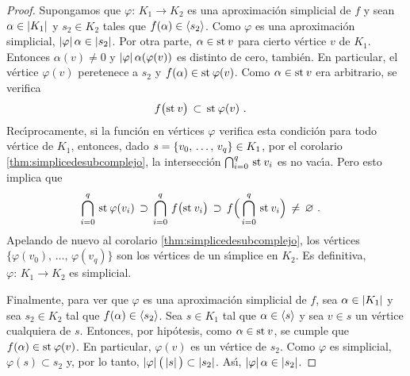 \begin{proof}
	Supongamos que $\varphi:\,K_{1}\rightarrow K_{2}$ es una
	aproximaci\'{o}n simplicial de $f$ y sean $\alpha\in\left|K_{1}\right|$ y
	$s_{2}\in K_{2}$ tales que $f(\alpha)\in\langle s_{2}\rangle$.
	Como $\varphi$ es una aproximaci\'{o}n simplicial,
	$\left|\varphi\right|\alpha\in\left|s_{2}\right|$. Por otra parte,
	$\alpha\in\mathrm{st}_{}\,v$ para cierto v\'{e}rtice $v$ de $K_{1}$.
	Entonces $\alpha(v)\not =0$ y $\left|\varphi\right|\alpha(\varphi(v))$
	es distinto de cero, tambi\'{e}n. En particular, el v\'{e}rtice
	$\varphi(v)$ peretenece a $s_{2}$ y
	$f(\alpha)\in\mathrm{st}_{}\,\varphi(v)$. Como $\alpha\in\mathrm{st}_{}\,v$
	era arbitrario, se verifica
	\begin{align*}
		f\big(\mathrm{st}_{}\,v\big) & \,\subset\,\mathrm{st}_{}\,\varphi(v)
		\text{ .}
	\end{align*}
	Rec\'{\i}procamente, si la funci\'{o}n en v\'{e}rtices $\varphi$
	verifica esta condici\'{o}n para todo v\'{e}rtice de $K_{1}$,
	entonces, dado $s=\{\lista[0]{v}{q}\}\in K_{1}$, por el corolario
	\ref{thm:simplicedesubcomplejo}, la intersecci\'{o}n
	$\bigcap_{i=0}^{q}\,\mathrm{st}_{}\,v_{i}$ es no vac\'{\i}a. Pero esto
	implica que
	\begin{align*}
		\bigcap_{i=0}^{q}\,\mathrm{st}_{}\,\varphi(v_{i}) & \,\supset\,
			\bigcap_{i=0}^{q}\,f\big(\mathrm{st}_{}\,v_{i}\big)
				\,\supset\,
			f\Big(\bigcap_{i=0}^{q}\,\mathrm{st}_{}\,v_{i}\Big)
			\,\not=\,\varnothing
		\text{ .}
	\end{align*}
	Apelando de nuevo al corolario \ref{thm:simplicedesubcomplejo},
	los v\'{e}rtices $\{\varphi(v_{0}),\,\dots,\,\varphi(v_{q})\}$
	son los v\'{e}rtices de un s\'{\i}mplice en $K_{2}$. Es definitiva,
	$\varphi:\,K_{1}\rightarrow K_{2}$ es simplicial.

	Finalmente, para ver que $\varphi$ es una aproximaci\'{o}n simplicial
	de $f$, sea $\alpha\in\left|K_{1}\right|$ y sea $s_{2}\in K_{2}$ tal que
	$f(\alpha)\in\langle s_{2}\rangle$. Sea $s\in K_{1}$ tal que
	$\alpha\in\langle s\rangle$ y sea $v\in s$ un v\'{e}rtice cualquiera
	de $s$. Entonces, por hip\'{o}tesis, como $\alpha\in\mathrm{st}_{}\,v$,
	se cumple que $f(\alpha)\in\mathrm{st}_{}\,\varphi(v)$. En particular,
	$\varphi(v)$ es un v\'{e}rtice de $s_{2}$. Como $\varphi$ es
	simplicial, $\varphi(s)\subset s_{2}$ y, por lo tanto,
	$\left|\varphi\right|\big(\left|s\right|\big)\subset\left|s_{2}\right|$. As\'{\i},
	$\left|\varphi\right|\alpha\in\left|s_{2}\right|$.
\end{proof}

